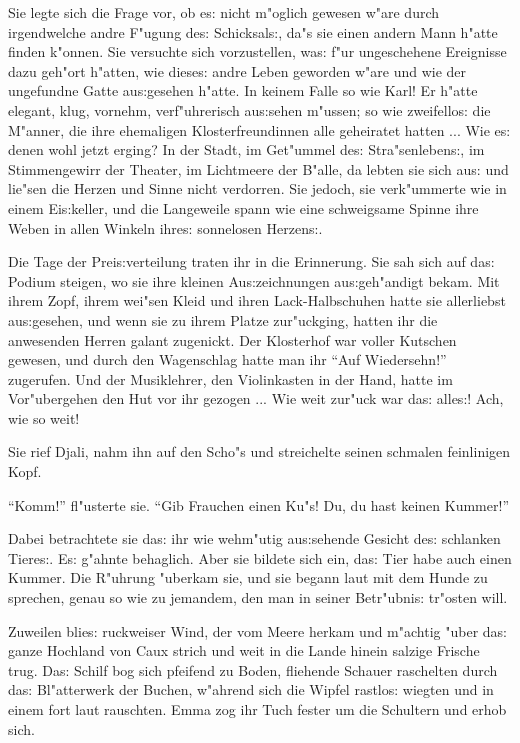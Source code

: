 \documentclass[oneside,12pt]{book}
\newcommand{\s}{s:}%
\begin{document}
Sie legte sich die Frage vor, ob e{\s} nicht m"oglich gewesen
w"are durch irgendwelche andre F"ugung de{\s} Schicksal{\s}, da"s
sie einen andern Mann h"atte finden k"onnen. Sie versuchte sich
vorzustellen, wa{\s} f"ur ungeschehene Ereignisse dazu geh"ort
h"atten, wie diese{\s} andre Leben geworden w"are und wie der
ungefundne Gatte au{\s}gesehen h"atte. In keinem Falle so wie
Karl! Er h"atte elegant, klug, vornehm, verf"uhrerisch au{\s}sehen
m"ussen; so wie zweifello{\s} die M"anner, die ihre ehemaligen
Klosterfreundinnen alle geheiratet hatten ... Wie e{\s} denen wohl
jetzt erging? In der Stadt, im Get"ummel de{\s} Stra"senleben{\s},
im Stimmengewirr der Theater, im Lichtmeere der B"alle, da lebten
sie sich au{\s} und lie"sen die Herzen und Sinne nicht verdorren.
Sie jedoch, sie verk"ummerte wie in einem Ei{\s}keller, und die
Langeweile spann wie eine schweigsame Spinne ihre Weben in allen
Winkeln ihre{\s} sonnelosen Herzen{\s}.

Die Tage der Prei{\s}verteilung traten ihr in die Erinnerung. Sie
sah sich auf da{\s} Podium steigen, wo sie ihre kleinen
Au{\s}zeichnungen au{\s}geh"andigt bekam. Mit ihrem Zopf, ihrem
wei"sen Kleid und ihren Lack-Halbschuhen hatte sie allerliebst
au{\s}gesehen, und wenn sie zu ihrem Platze zur"uckging, hatten
ihr die anwesenden Herren galant zugenickt. Der Klosterhof war
voller Kutschen gewesen, und durch den Wagenschlag hatte man ihr
"`Auf Wiedersehn!"' zugerufen. Und der Musiklehrer, den
Violinkasten in der Hand, hatte im Vor"ubergehen den Hut vor ihr
gezogen ... Wie weit zur"uck war da{\s} alle{\s}! Ach, wie so
weit!

Sie rief Djali, nahm ihn auf den Scho"s und streichelte seinen
schmalen feinlinigen Kopf.

"`Komm!"' fl"usterte sie. "`Gib Frauchen einen Ku"s! Du, du hast
keinen Kummer!"'

Dabei betrachtete sie da{\s} ihr wie wehm"utig au{\s}sehende
Gesicht de{\s} schlanken Tiere{\s}. E{\s} g"ahnte behaglich. Aber
sie bildete sich ein, da{\s} Tier habe auch einen Kummer. Die
R"uhrung "uberkam sie, und sie begann laut mit dem Hunde zu
sprechen, genau so wie zu jemandem, den man in seiner
Betr"ubni{\s} tr"osten will.

Zuweilen blie{\s} ruckweiser Wind, der vom Meere herkam und
m"achtig "uber da{\s} ganze Hochland von Caux strich und weit in
die Lande hinein salzige Frische trug. Da{\s} Schilf bog sich
pfeifend zu Boden, fliehende Schauer raschelten durch da{\s}
Bl"atterwerk der Buchen, w"ahrend sich die Wipfel rastlo{\s}
wiegten und in einem fort laut rauschten. Emma zog ihr Tuch fester
um die Schultern und erhob sich.
\end{document}
